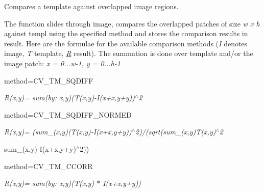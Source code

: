 Compares a template against overlapped image regions.

The function slides through {\ttfamily image}, compares the overlapped patches of size {\itshape w x h} against {\ttfamily templ} using the specified method and stores the comparison results in {\ttfamily result}. Here are the formulae for the available comparison methods ({\itshape I} denotes {\ttfamily image}, {\itshape T} {\ttfamily template}, {\itshape \mbox{\hyperlink{classorg_1_1opencv_1_1_r}{R}}} {\ttfamily result}). The summation is done over template and/or the image patch\+: {\itshape x\textquotesingle{} = 0...w-\/1, y\textquotesingle{} = 0...h-\/1}


\begin{DoxyItemize}
\item method=C\+V\+\_\+\+T\+M\+\_\+\+S\+Q\+D\+I\+FF 
\end{DoxyItemize}

{\itshape R(x,y)= sum(by\+: x\textquotesingle{},y\textquotesingle{})(T(x\textquotesingle{},y\textquotesingle{})-\/I(x+x\textquotesingle{},y+y\textquotesingle{}))$^\wedge$2}


\begin{DoxyItemize}
\item method=C\+V\+\_\+\+T\+M\+\_\+\+S\+Q\+D\+I\+F\+F\+\_\+\+N\+O\+R\+M\+ED 
\end{DoxyItemize}

{\itshape R(x,y)= (sum\+\_\+(x\textquotesingle{},y\textquotesingle{})(T(x\textquotesingle{},y\textquotesingle{})-\/I(x+x\textquotesingle{},y+y\textquotesingle{}))$^\wedge$2)/(sqrt(sum\+\_\+(x\textquotesingle{},y\textquotesingle{})T(x\textquotesingle{},y\textquotesingle{})$^\wedge$2
\begin{DoxyItemize}
\item sum\+\_\+(x\textquotesingle{},y\textquotesingle{}) I(x+x\textquotesingle{},y+y\textquotesingle{})$^\wedge$2))
\end{DoxyItemize}}

{\itshape }

{\itshape 
\begin{DoxyItemize}
\item method=C\+V\+\_\+\+T\+M\+\_\+\+C\+C\+O\+RR 
\end{DoxyItemize}}

{\itshape }

{\itshape {\itshape R(x,y)= sum(by\+: x\textquotesingle{},y\textquotesingle{})(T(x\textquotesingle{},y\textquotesingle{}) $\ast$ I(x+x\textquotesingle{},y+y\textquotesingle{}))}}

